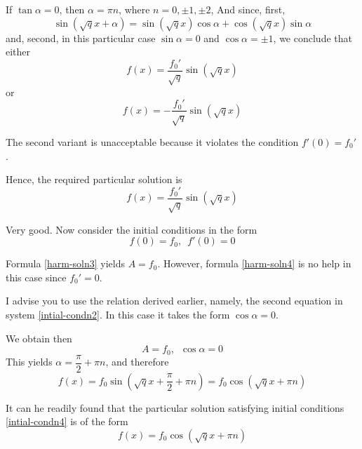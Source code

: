 If $\tan \alpha =0$, then $\alpha= \pi n$, where $n= 0, \pm 1, \pm 2$, And since, first,	
\begin{equation*}%
\sin 	(\sqrt{q}x	+ \alpha)	=	\sin 	(\sqrt{q} x)	\cos \alpha	 + \cos (\sqrt{q}x) \sin \alpha	
\end{equation*}
and, second, in  this particular case $\sin \alpha = 0$ and $\cos \alpha =	\pm 1$, we conclude that either
\begin{equation*}%
f(x) = \dfrac{f_{0}\prime}{\sqrt{q}} \sin (\sqrt{q} x)	
\end{equation*}
or 
\begin{equation*}%
f(x) = - \dfrac{f_{0}\prime}{\sqrt{q}} \sin (\sqrt{q} x)	
\end{equation*}

\athr The second variant is unacceptable because it violates the condition $f\prime (0) =f_{0}'$.

\rdr Hence, the required particular solution is 
\begin{equation}%
f(x) = \dfrac{f_{0}\prime}{\sqrt{q}} \sin (\sqrt{q} x)	
\label{harm-soln6}
\end{equation}

\athr Very good. Now consider the initial conditions
in the form
\begin{equation}%
f(0)= f_{0}, \,\,\, f\prime(0)= 0
\label{intial-condn4}
\end{equation}

\rdr Formula \eqref{harm-soln3} yields $A = f_{0}$. However, formula \eqref{harm-soln4} is no help in this case since $ f_{0}' =0$.

\athr I advise you to use the relation derived earlier, namely, the second equation in system \eqref{intial-condn2}. In this case it takes the form $\cos \alpha = 0$.

\rdr We obtain then
\begin{equation}%
A = f_{0}, \,\,\, \cos \alpha = 0
\label{intial-condn4}
\end{equation}
This yields $\alpha = \dfrac{\pi}{2} + \pi n$, and therefore
 \begin{equation*}%
f(x) = f_{0} \sin \left(\sqrt{q} x + \dfrac{\pi}{2} + \pi n \right)=  f_{0} \cos \left(\sqrt{q} x + \pi n \right)
\end{equation*}

\athr It can he readily found that the particular
solution satisfying initial conditions \eqref{intial-condn4} is of the form
\begin{equation}%
f(x) = f_{0} \cos \left(\sqrt{q} x + \pi n \right)
\label{harm-soln7}
\end{equation}

